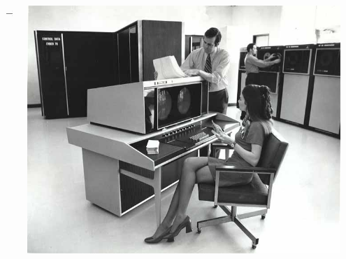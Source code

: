 \begin{frame}
\begin{columns}
\begin{column}{.3\textwidth}
\begin{center}
      \end{center}
    \end{column}
    \begin{column}{.05\textwidth}
      \centerline{$\longrightarrow$}
    \end{column}
    \begin{column}{.3\textwidth}
      \begin{center}
        \includegraphics[width=.9\textwidth]{images/mainframe-console.jpg}
      \end{center}
    \end{column}
  \end{columns}
\end{frame}

